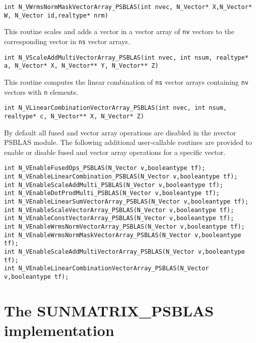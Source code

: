 \documentclass[twoside,a4paper]{refart}
\begin{document}
\begin{description}
 	 \lstinline[style=CStyle]|int N_VWrmsNormMaskVectorArray_PSBLAS(int nvec, N_Vector* X,N_Vector* W, N_Vector id,realtype* nrm)|
 	
 	\item[\fbox{\texttt{N\_VScaleAddMultiVectorArray\_PSBLAS}}] This routine scales and adds a vector in a vector array of
 	\lstinline[style=CStyle]|nv| vectors to the corresponding vector in \lstinline[style=CStyle]|ns| vector arrays.
 	
 	 \lstinline[style=CStyle]|int N_VScaleAddMultiVectorArray_PSBLAS(int nvec, int nsum, realtype* a, N_Vector* X, N_Vector** Y, N_Vector** Z)|
 	
 	\item[\fbox{\texttt{N\_VLinearCombinationVectorArray\_PSBLAS}}] This routine computes the linear combination of \lstinline[style=CStyle]|ns| vector
 	arrays containing \lstinline[style=CStyle]|nv| vectors with \lstinline[style=CStyle]|n| elements.
 	
 	 \lstinline[style=CStyle]|int N_VLinearCombinationVectorArray_PSBLAS(int nvec, int nsum, realtype* c, N_Vector** X, N_Vector* Z)|
\end{description}

By default all fused and vector array operations are disabled in the nvector PSBLAS module.
The following additional user-callable routines are provided to enable or disable fused and vector
array operations for a specific vector.
\begin{lstlisting}[style=CStyle]
int N_VEnableFusedOps_PSBLAS(N_Vector v,booleantype tf);
int N_VEnableLinearCombination_PSBLAS(N_Vector v,booleantype tf);
int N_VEnableScaleAddMulti_PSBLAS(N_Vector v,booleantype tf);
int N_VEnableDotProdMulti_PSBLAS(N_Vector v,booleantype tf);
int N_VEnableLinearSumVectorArray_PSBLAS(N_Vector v,booleantype tf);
int N_VEnableScaleVectorArray_PSBLAS(N_Vector v,booleantype tf);
int N_VEnableConstVectorArray_PSBLAS(N_Vector v,booleantype tf);
int N_VEnableWrmsNormVectorArray_PSBLAS(N_Vector v,booleantype tf);
int N_VEnableWrmsNormMaskVectorArray_PSBLAS(N_Vector v,booleantype tf);
int N_VEnableScaleAddMultiVectorArray_PSBLAS(N_Vector v,booleantype tf);
int N_VEnableLinearCombinationVectorArray_PSBLAS(N_Vector v,booleantype tf);
\end{lstlisting}

\section{The SUNMATRIX\_PSBLAS implementation}\label{sec:sunmatrix}
\end{document}
